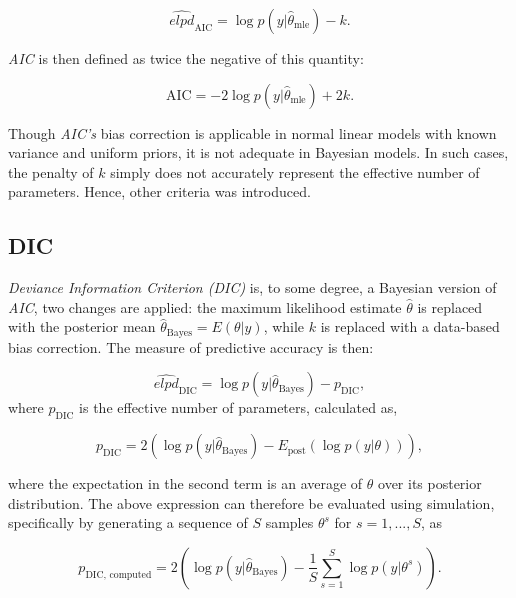 \documentclass[
  11pt,
]{article}
\begin{document}
\begin{equation}
\widehat{elpd}_{\text{AIC}} = \log p(y|\hat{\theta}_{\text{mle}}) - k.
\end{equation}

\emph{AIC} is then defined as twice the negative of this quantity:

\begin{equation}
\text{AIC} = -2 \log p(y|\hat{\theta}_{\text{mle}}) + 2k.
\end{equation}

Though \emph{AIC's} bias correction is applicable in normal linear
models with known variance and uniform priors, it is not adequate in
Bayesian models. In such cases, the penalty of \(k\) simply does not
accurately represent the effective number of parameters. Hence, other
criteria was introduced.

\subsection{DIC}

\emph{Deviance Information Criterion (DIC)} is, to some degree, a
Bayesian version of \emph{AIC}, two changes are applied: the maximum
likelihood estimate \(\hat{\theta}\) is replaced with the posterior mean
\(\hat{\theta}_{\text{Bayes}} = E(\theta | y)\), while \(k\) is replaced
with a data-based bias correction. The measure of predictive accuracy is
then:

\begin{equation}
\widehat{elpd}_{\text{DIC}} = \log p(y|\hat{\theta}_{\text{Bayes}}) - p_{\text{DIC}},
\end{equation} where \(p_{\text{DIC}}\) is the effective number of
parameters, calculated as,

\begin{equation}
p_{\text{DIC}} = 2\left(\log p(y|\hat{\theta}_{\text{Bayes}}) - E_{\text{post}}\left(\log p(y|\theta)\right)\right),
\end{equation}

where the expectation in the second term is an average of \(\theta\)
over its posterior distribution. The above expression can therefore be
evaluated using simulation, specifically by generating a sequence of
\(S\) samples \(\theta^s\) for \(s = 1, . . . , S\), as

\begin{equation}
p_{\text{DIC, computed}} = 2 \left(\log p(y|\hat{\theta}_{\text{Bayes}}) - \frac{1}{S} \sum_{s=1}^{S} \log p(y|{\theta}^s)\right).
\end{equation}
\end{document}
